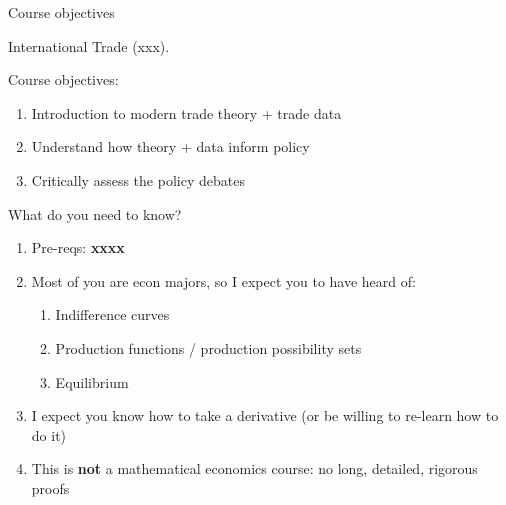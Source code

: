 \documentclass[notes,11pt, aspectratio=169, xcolor=table]{beamer}
\newenvironment{wideitemize}{\itemize\addtolength{\itemsep}{10pt}}{\enditemize}
\begin{document}
\begin{frame}{Course objectives}
\begin{wideitemize}
\item International Trade (xxx).
\item Course objectives:
    \begin{enumerate}
        \item Introduction to modern trade theory + trade data
        \item Understand how theory + data inform policy
        \item Critically assess the policy debates
    \end{enumerate}

\item What do you need to know?
    \begin{enumerate}
        \item Pre-reqs: \textbf{xxxx}
        \item Most of you are econ majors, so I expect you to have heard of:
        \begin{enumerate}
            \item Indifference curves
            \item Production functions / production possibility sets
            \item Equilibrium
        \end{enumerate}
        \item I expect you know how to take a derivative (or be willing to re-learn how to do it)
        \item This is \textbf{not} a mathematical economics course: no long, detailed, rigorous proofs
    \end{enumerate}

\end{wideitemize}    
\end{frame}
\end{document}
